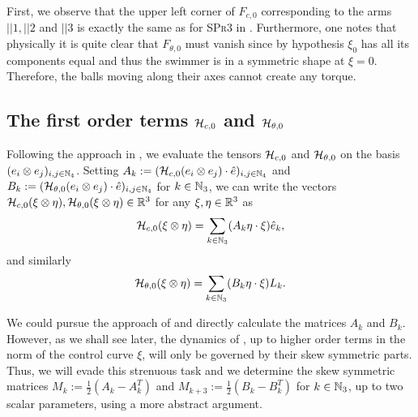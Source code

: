 \begin{remark}
First, we observe that the upper left corner of $F_{c,0}$ corresponding to the arms $||1, ||2$ and $||3$ is exactly the same as for \textsc{SPr3} in \cite{Alouges2017}. Furthermore, one notes that physically it is quite clear that $F_{\theta,0}$ must vanish since by hypothesis $\xi_0$ has all its components equal and thus the swimmer is in a symmetric shape at $\xi = 0$. Therefore, the balls moving along their axes cannot create any torque.
\end{remark}

\subsection{The first order terms $\mathcal{H}_{c,0}$ and $\mathcal{H}_{\theta,0}$}
Following the approach in \cite{Alouges2017}, we evaluate the tensors $\mathcal{H}_{c,0}$ and $\mathcal{H}_{\theta,0}$ on the basis $(e_{i} \otimes e_{j})_{i,j \in \mathbb{N}_4}$. Setting $A_k := (\mathcal{H}_{c,0}(e_i \otimes e_j)\cdot \hat{e})_{i,j \in \mathbb{N}_4}$ and $B_k:= (\mathcal{H}_{\theta,0}(e_i \otimes e_j)\cdot \hat{e})_{i,j \in \mathbb{N}_4}$ for $k \in \mathbb{N}_3$, we can write the vectors $\mathcal{H}_{c,0}(\xi \otimes \eta), \mathcal{H}_{\theta,0}(\xi \otimes \eta) \in \mathbb{R}^3$ for any $\xi, \eta \in \mathbb{R}^3$ as
\begin{equation}
\label{eq: matrix representation of spatial first order term}
	\mathcal{H}_{c,0}(\xi \otimes \eta) = \sum_{k \in \mathbb{N}_3}(A_k \eta \cdot \xi)\hat{e}_k, 
\end{equation}
and similarly
\begin{equation}
\label{eq: matrix representation of angular first order term}
	\mathcal{H}_{\theta, 0}(\xi \otimes \eta) = \sum_{k \in \mathbb{N}_3}(B_k \eta \cdot \xi) L_k.
\end{equation}

We could pursue the approach of \cite{Alouges2017} and directly calculate the matrices $A_k$ and $B_k$. However, as we shall see later, the dynamics of \spr, up to higher order terms in the norm of the control curve $\xi$, will only be governed by their skew symmetric parts. Thus, we will evade this strenuous task and we determine the skew symmetric matrices $M_k := \tfrac{1}{2}(A_k - A_k^T)$ and $M_{k + 3}:= \tfrac{1}{2}(B_k - B_k^T)$ for $k \in \mathbb{N}_3$, up to two scalar parameters, using a more abstract argument.


